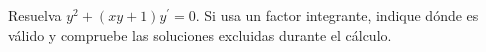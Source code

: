 Resuelva $y^2+(xy+1)y^{\prime}=0$. Si usa un factor integrante, indique dónde es válido y compruebe las soluciones excluidas durante el cálculo.
